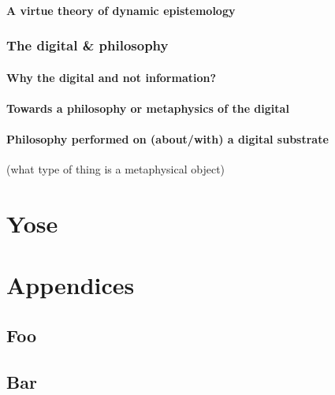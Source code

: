 \documentclass[dah,phd,a4paper]{xe_uccthesis}
\begin{document}
\lipsum[95]

\subsection{A virtue theory of dynamic epistemology}

\lipsum[96]

\section{The digital \& philosophy}


\subsection{Why the digital and not information?}

\lipsum[97]

\subsection{Towards a philosophy or metaphysics of the digital}

\lipsum[98]

\subsection{Philosophy performed on (about/with) a digital substrate}

\lipsum[99]

(what type of thing is a metaphysical object)

\part*{Yose}

\part*{Appendices}
\cleardoublepage
{}
\appendix
{}
\renewcommand\thechapter{\Roman{chapter}}
\chapter{Foo}
\chapter{Bar}

\end{document}
